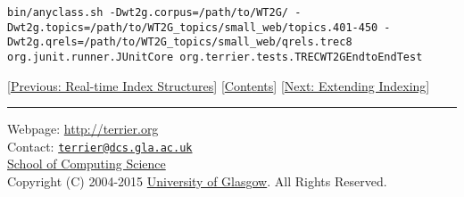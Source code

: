 \begin{verbatim}
bin/anyclass.sh -Dwt2g.corpus=/path/to/WT2G/ -Dwt2g.topics=/path/to/WT2G_topics/small_web/topics.401-450 -Dwt2g.qrels=/path/to/WT2G_topics/small_web/qrels.trec8 org.junit.runner.JUnitCore org.terrier.tests.TRECWT2GEndtoEndTest
\end{verbatim}

{[}\href{realtime_indices.html}{Previous: Real-time Index Structures}{]}
{[}\href{index.html}{Contents}{]} {[}\href{extend_indexing.html}{Next:
Extending Indexing}{]}

\begin{center}\rule{0.5\linewidth}{\linethickness}\end{center}

Webpage: \url{http://terrier.org}\\
Contact:
\href{mailto:terrier@dcs.gla.ac.uk}{\nolinkurl{terrier@dcs.gla.ac.uk}}\\
\href{http://www.dcs.gla.ac.uk/}{School of Computing Science}\\
Copyright (C) 2004-2015 \href{http://www.gla.ac.uk/}{University of
Glasgow}. All Rights Reserved.
